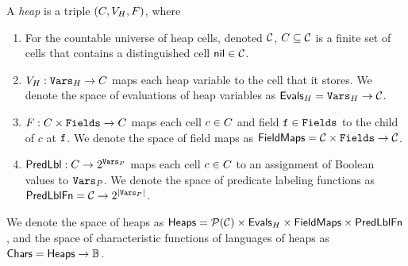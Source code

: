 \begin{defn}
  \label{defn:states}
  A \lang \emph{heap} is a triple $(C, V_H,
  F)$, where
  \begin{enumerate}
  \item
    For the countable universe of heap cells, denoted $\mathcal{C}$,
    $C \subseteq \mathcal{C}$ is a finite set of cells that contains
    a distinguished cell $\mathsf{nil} \in \mathcal{C}$.
  \item
    $V_H: \mathtt{Vars}_H \to C$ maps each heap variable to
    the cell that it stores.
    We denote the space of evaluations of heap variables as
    $\mathsf{Evals}_H = \mathtt{Vars}_H \to \mathcal{C}$.
  \item
    $F: C \times \mathtt{Fields} \to C$ maps each cell
    $c \in C$ and field $\mathtt{f} \in \mathtt{Fields}$ to the child of
    $c$ at $\mathtt{f}$.
    We denote the space of field maps as $\mathsf{FieldMaps} = \mathcal{C} \times
    \mathtt{Fields} \to \mathcal{C}$.

  \item
    $\mathsf{PredLbl}: C \to 2^{\mathtt{Vars}_P}$ maps each cell
    $c \in C$ to an assignment of Boolean values to $\mathtt{Vars}_P$.
    We denote the space of predicate labeling functions as
    $\mathsf{PredLblFn} = \mathcal{C} \to 2^{|\mathtt{Vars}_P|}$.

  \end{enumerate}
  We denote the space of heaps as $\mathsf{Heaps} = \mathcal{P}(\mathcal{C}) \times
  \mathsf{Evals}_H \times \mathsf{FieldMaps} \times \mathsf{PredLblFn}$, and the space of
  characteristic functions of languages of heaps as $\mathsf{Chars} = \mathsf{Heaps}
  \to \mathbb{B}$.
\end{defn}

